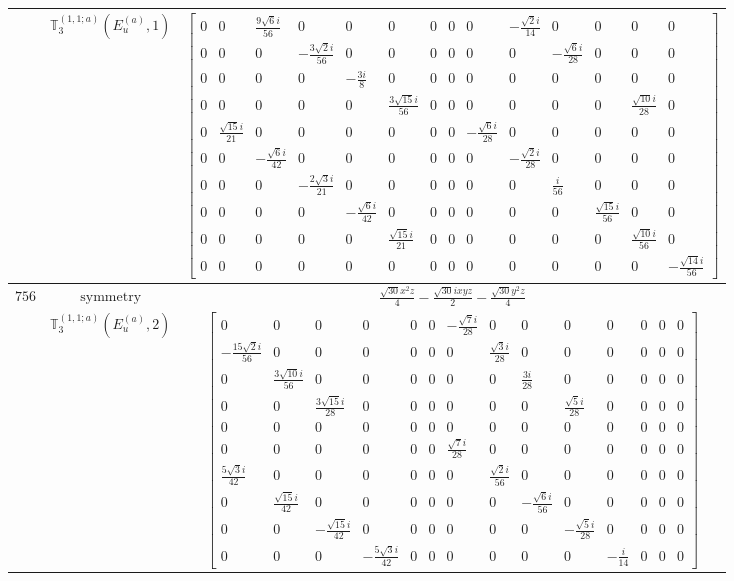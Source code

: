 \documentclass[fleqn,8pt,landscape]{jsarticle}
\begin{document}
\begin{longtable}{ccc}
$  $ & $ \mathbb{T}_{3}^{(1,1;a)}(E_{u}^{(a)},1) $ & $ \begin{bmatrix} 0 & 0 & \frac{9 \sqrt{6} i}{56} & 0 & 0 & 0 & 0 & 0 & 0 & - \frac{\sqrt{2} i}{14} & 0 & 0 & 0 & 0 \\ 0 & 0 & 0 & - \frac{3 \sqrt{2} i}{56} & 0 & 0 & 0 & 0 & 0 & 0 & - \frac{\sqrt{6} i}{28} & 0 & 0 & 0 \\ 0 & 0 & 0 & 0 & - \frac{3 i}{8} & 0 & 0 & 0 & 0 & 0 & 0 & 0 & 0 & 0 \\ 0 & 0 & 0 & 0 & 0 & \frac{3 \sqrt{15} i}{56} & 0 & 0 & 0 & 0 & 0 & 0 & \frac{\sqrt{10} i}{28} & 0 \\ 0 & \frac{\sqrt{15} i}{21} & 0 & 0 & 0 & 0 & 0 & 0 & - \frac{\sqrt{6} i}{28} & 0 & 0 & 0 & 0 & 0 \\ 0 & 0 & - \frac{\sqrt{6} i}{42} & 0 & 0 & 0 & 0 & 0 & 0 & - \frac{\sqrt{2} i}{28} & 0 & 0 & 0 & 0 \\ 0 & 0 & 0 & - \frac{2 \sqrt{3} i}{21} & 0 & 0 & 0 & 0 & 0 & 0 & \frac{i}{56} & 0 & 0 & 0 \\ 0 & 0 & 0 & 0 & - \frac{\sqrt{6} i}{42} & 0 & 0 & 0 & 0 & 0 & 0 & \frac{\sqrt{15} i}{56} & 0 & 0 \\ 0 & 0 & 0 & 0 & 0 & \frac{\sqrt{15} i}{21} & 0 & 0 & 0 & 0 & 0 & 0 & \frac{\sqrt{10} i}{56} & 0 \\ 0 & 0 & 0 & 0 & 0 & 0 & 0 & 0 & 0 & 0 & 0 & 0 & 0 & - \frac{\sqrt{14} i}{56} \end{bmatrix} $ \\ \hline
$ 756 $ & $ \text{symmetry} $ & $ \frac{\sqrt{30} x^{2} z}{4} - \frac{\sqrt{30} i x y z}{2} - \frac{\sqrt{30} y^{2} z}{4} $ \\
$  $ & $ \mathbb{T}_{3}^{(1,1;a)}(E_{u}^{(a)},2) $ & $ \begin{bmatrix} 0 & 0 & 0 & 0 & 0 & 0 & - \frac{\sqrt{7} i}{28} & 0 & 0 & 0 & 0 & 0 & 0 & 0 \\ - \frac{15 \sqrt{2} i}{56} & 0 & 0 & 0 & 0 & 0 & 0 & \frac{\sqrt{3} i}{28} & 0 & 0 & 0 & 0 & 0 & 0 \\ 0 & \frac{3 \sqrt{10} i}{56} & 0 & 0 & 0 & 0 & 0 & 0 & \frac{3 i}{28} & 0 & 0 & 0 & 0 & 0 \\ 0 & 0 & \frac{3 \sqrt{15} i}{28} & 0 & 0 & 0 & 0 & 0 & 0 & \frac{\sqrt{5} i}{28} & 0 & 0 & 0 & 0 \\ 0 & 0 & 0 & 0 & 0 & 0 & 0 & 0 & 0 & 0 & 0 & 0 & 0 & 0 \\ 0 & 0 & 0 & 0 & 0 & 0 & \frac{\sqrt{7} i}{28} & 0 & 0 & 0 & 0 & 0 & 0 & 0 \\ \frac{5 \sqrt{3} i}{42} & 0 & 0 & 0 & 0 & 0 & 0 & \frac{\sqrt{2} i}{56} & 0 & 0 & 0 & 0 & 0 & 0 \\ 0 & \frac{\sqrt{15} i}{42} & 0 & 0 & 0 & 0 & 0 & 0 & - \frac{\sqrt{6} i}{56} & 0 & 0 & 0 & 0 & 0 \\ 0 & 0 & - \frac{\sqrt{15} i}{42} & 0 & 0 & 0 & 0 & 0 & 0 & - \frac{\sqrt{5} i}{28} & 0 & 0 & 0 & 0 \\ 0 & 0 & 0 & - \frac{5 \sqrt{3} i}{42} & 0 & 0 & 0 & 0 & 0 & 0 & - \frac{i}{14} & 0 & 0 & 0 \end{bmatrix} $ \\ \hline

\end{longtable}
\end{document}
